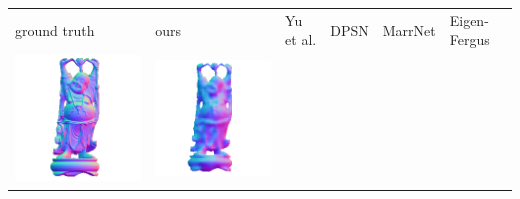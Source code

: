 \begin{tabularx}{\linewidth}{@{}Y@{}Y@{}Y@{}Y@{}Y@{}Y@{}}
ground truth & ours & Yu et al. & DPSN & MarrNet & Eigen-Fergus \\
\includegraphics[width=\linewidth]{semisynthetic/20150514_20_gt.png} &
\includegraphics[width=\linewidth]{semisynthetic/20150514_20_ours_out.png} &

\end{tabularx}
